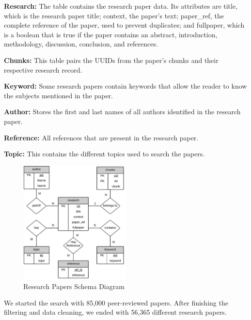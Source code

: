 \begin{description}
	\item{\textbf{Research:}}  The table contains the research paper data. Its attributes are title, which is the research paper title; context, the paper’s text; paper\_ref, the complete reference of the paper, used to prevent duplicates; and fullpaper, which is a boolean that is true if the paper contains an abstract, introduction, methodology, discussion, conclusion, and references.
	\item{\textbf{Chunks:}} This table pairs the UUIDs from the paper's chunks and their respective research record.  
	\item{\textbf{Keyword:}} Some research papers contain keywords that allow the reader to know the subjects mentioned in the paper. 
	\item{\textbf{Author:}} Stores the first and last names of all authors identified in the research paper. 
	\item{\textbf{Reference:}} All references that are present in the research paper.
	\item{\textbf{Topic:}} This contains the different topics used to search the papers.

\end{description}

\begin{figure}[h]
	\begin{center}
		\includegraphics[width=0.5\textwidth]{figures/Table_diagram.jpeg} %
	\end{center}
	\caption{Research Papers Schema Diagram} %
	\label{fig:table}
\end{figure}


We started the search with 85,000 peer-reviewed papers. After finishing the filtering and data cleaning, we ended with 56,365 different research papers. 



